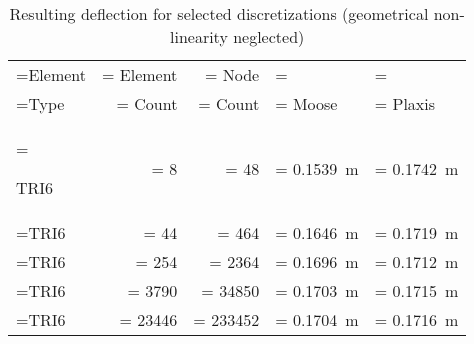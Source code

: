 \begin{table}[htbp]
    \centering
    \caption{Resulting deflection for selected discretizations (geometrical non-linearity neglected)}
    \label{bended-plate:tab:results}
    \begin{tabularx}{\textwidth}{
            >{\hsize\linewidth=\hsize}X
            >{\hsize\linewidth=\hsize}R
            >{\hsize\linewidth=\hsize}R
            >{\hsize\linewidth=\hsize}Y
            >{\hsize\linewidth=\hsize}Y}

        \hline


        Element & Element        & Node           &                                                                                                 \\

        Type    & Count          & Count          & Moose                                      & Plaxis               \\

        \hline

        TRI6    & \qty{8}{}      & \qty{48}{}     & \qty{0.1539}{\metre}                       & \qty{0.1742}{\metre} \\

        TRI6    & \qty{44}{}     & \qty{464}{}    & \qty{0.1646}{\metre}                       & \qty{0.1719}{\metre}
        \\

        TRI6    & \qty{254}{}    & \qty{2364}{}   & \qty{0.1696}{\metre}                       & \qty{0.1712}{\metre}
        \\ %

        TRI6    & \qty{3790}{}   & \qty{34850}{}  & \qty{0.1703}{\metre}                       &
        \qty{0.1715}{\metre}                                                                                          \\ %

        TRI6    & \qty{23446}{}  & \qty{233452}{} & \qty{0.1704}{\metre}                       &
        \qty{0.1716}{\metre}                                                                                          \\ %


\end{tabularx}
\end{table}
